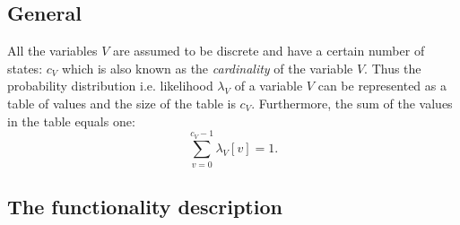 \documentclass[12pt,a4paper]{report}
\begin{document}
\subsection{General}
All the variables $V$ are assumed to be discrete and have a certain
number of states: $c_V$ which is also known as the {\it cardinality} 
of the variable $V$. Thus the probability distribution i.e. likelihood 
$\lambda_V$ of a variable $V$ can be represented as a table of values 
and the size of the table is $c_V$. Furthermore, the sum of the values 
in the table equals one:
\begin{equation}
\sum_{v=0}^{c_V-1} \lambda_V[v] = 1.
\end{equation}

\subsection{The functionality description}
\end{document}
